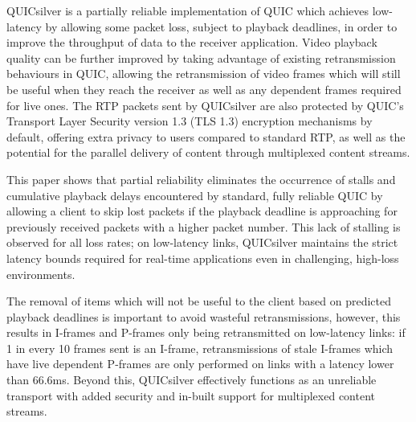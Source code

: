 \documentclass{mpaper}
\begin{document}
QUICsilver is a partially reliable implementation of QUIC which achieves low-latency by allowing some packet loss, subject to playback deadlines, in order to improve the throughput of data to the receiver application. Video playback quality can be further improved by taking advantage of existing retransmission behaviours in QUIC, allowing the retransmission of video frames which will still be useful when they reach the receiver as well as any dependent frames required for live ones. The RTP packets sent by QUICsilver are also protected by QUIC's Transport Layer Security version 1.3 (TLS 1.3) \cite{TLS-RFC} encryption mechanisms by default, offering extra privacy to users compared to standard RTP, as well as the potential for the parallel delivery of content through multiplexed content streams.
  
This paper shows that partial reliability eliminates the occurrence of stalls and cumulative playback delays encountered by standard, fully reliable QUIC by allowing a client to skip lost packets if the playback deadline is approaching for previously received packets with a higher packet number. This lack of stalling is observed for all loss rates; on low-latency links, QUICsilver maintains the strict latency bounds required for real-time applications even in challenging, high-loss environments.

The removal of items which will not be useful to the client based on predicted playback deadlines is important to avoid wasteful retransmissions, however, this results in I-frames and P-frames only being retransmitted on low-latency links: if 1 in every 10 frames sent is an I-frame, retransmissions of stale I-frames which have live dependent P-frames are only performed on links with a latency lower than 66.6ms. Beyond this, QUICsilver effectively functions as an unreliable transport with added security and in-built support for multiplexed content streams.





\end{document}

